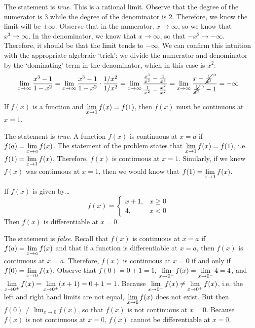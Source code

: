 \documentclass[11pt,letterpaper]{article}
\begin{document}
\sol The statement is \textit{true}. This is a rational limit. Observe that the degree of the numerator is 3 while the degree of the denominator is 2. Therefore, we know the limit will be $\pm\infty$. Observe that in the numerator, $x \to \infty$, so we know that $x^3 \to \infty$. In the denominator, we know that $x \to \infty$, so that $-x^2 \to -\infty$. Therefore, it should be that the limit tends to $-\infty$. We can confirm this intuition with the appropriate algebraic `trick': we divide the numerator and denominator by the `dominating' term in the denominator, which in this case is $x^2$:
	\[
	\lim_{x \to \infty} \dfrac{x^3 - 1}{1 - x^2}= \lim_{x \to \infty} \dfrac{x^3 - 1}{1 - x^2} \cdot \dfrac{1/x^2}{1/x^2}= \lim_{x \to \infty} \dfrac{\tfrac{x^3}{x^2} - \tfrac{1}{x^2}}{\tfrac{1}{x^2} - \tfrac{x^2}{x^2}}= \lim_{x \to \infty} \dfrac{x - \cancel{\tfrac{1}{x^2}}^{\,{}^0}}{\cancel{\tfrac{1}{x^2}}^{\,{}^0} - 1}= -\infty
	\] \pvspace{1.3cm}



 If $f(x)$ is a function and $\displaystyle\lim_{x \to 1} f(x) = f(1)$, then $f(x)$ must be continuous at $x= 1$. \pspace

\sol The statement is \textit{true}. A function $f(x)$ is continuous at $x= a$ if $\displaystyle f(a)= \lim_{x \to a} f(x)$. The statement of the problem states that $\displaystyle\lim_{x \to 1} f(x)= f(1)$, i.e. $\displaystyle f(1)= \lim_{x \to 1} f(x)$. Therefore, $f(x)$ is continuous at $x= 1$. Similarly, if we knew $f(x)$ was continuous at $x= 1$, then we would know that $\displaystyle f(1)= \lim_{x \to 1} f(x)$. \pvspace{1.3cm}



 If $f(x)$ is given by\dots
	\[
	f(x)=
	\begin{cases}
	x + 1, & x \geq 0 \\
	4, & x < 0
	\end{cases}
	\]
Then $f(x)$ is differentiable at $x= 0$. \pspace

\sol The statement is \textit{false}. Recall that $f(x)$ is continuous at $x= a$ if $\displaystyle f(a)= \lim_{x \to a} f(x)$ and that if a function is differentiable at $x= a$, then $f(x)$ is continuous at $x= a$. Therefore, $f(x)$ is continuous at $x= 0$ if and only if $\displaystyle f(0)= \lim_{x \to 0} f(x)$. Observe that $f(0)= 0 + 1= 1$, $\displaystyle\lim_{x \to 0^-} f(x)= \lim_{x \to 0^-} 4= 4$, and $\displaystyle\lim_{x \to 0^+} f(x)= \lim_{x \to 0^+} (x + 1)= 0 + 1= 1$. Because $\displaystyle\lim_{x \to 0^-} f(x) \neq \lim_{x \to 0^+} f(x)$, i.e. the left and right hand limits are not equal, $\displaystyle\lim_{x \to 0} f(x)$ does not exist. But then $f(0) \neq \lim_{x \to 0} f(x)$, so that $f(x)$ is not continuous at $x= 0$. Because $f(x)$ is not continuous at $x= 0$, $f(x)$ cannot be differentiable at $x= 0$. \pspace
\end{document}
